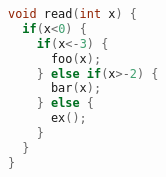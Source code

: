 \documentclass[border=3.141592]{standalone}
\begin{document}
\begin{lstlisting}[language=c]
void read(int x) {
  if(x<0) {         
    if(x<-3) {
      foo(x);
    } else if(x>-2) {
      bar(x);
    } else {
      ex();
    }
  }
}
\end{lstlisting}
\end{document}

